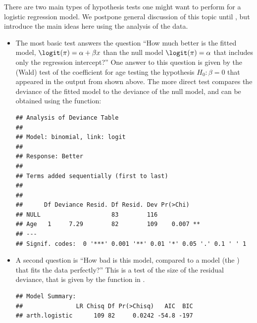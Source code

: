 \documentclass[11pt]{book}
\renewenvironment{knitrout}{\small\renewcommand{\baselinestretch}{.85}}{} %
\begin{document}
There are two main types of hypothesis tests one might want to perform for a
logistic regression model. We postpone general discussion of this
topic until , but introduce the main ideas here
using the analysis of the  data.
\begin{itemize}
  \item The most basic test answers the
question ``How much better is the fitted model, $\logit(\pi) = \alpha + \beta x$
than the null model $\logit(\pi) = \alpha$ that includes only the
regression intercept?'' One answer to this question is given by the
(Wald) test of the coefficient for age testing the hypothesis $H_0: \beta = 0$
that appeared in the output from
 shown above. 
The more direct test compares the deviance of the fitted model to the deviance
of the null model, and can be obtained using the  function:


\begin{knitrout}
\color{fgcolor}\begin{kframe}
\begin{alltt}
 \hlstd{=}\hlstd{)}
\end{alltt}
\begin{verbatim}
## Analysis of Deviance Table
## 
## Model: binomial, link: logit
## 
## Response: Better
## 
## Terms added sequentially (first to last)
## 
## 
##      Df Deviance Resid. Df Resid. Dev Pr(>Chi)   
## NULL                    83        116            
## Age   1     7.29        82        109    0.007 **
## ---
## Signif. codes:  0 '***' 0.001 '**' 0.01 '*' 0.05 '.' 0.1 ' ' 1
\end{verbatim}
\end{kframe}
\end{knitrout}

  \item A second question is ``How bad is this model, compared to a model
  (the ) that fits the data perfectly?''  This is a test
  of the size of the residual deviance, that is given by the function
   in .
\begin{knitrout}
\color{fgcolor}\begin{kframe}
\begin{alltt}
\end{alltt}
\begin{verbatim}
## Model Summary:
##               LR Chisq Df Pr(>Chisq)   AIC  BIC
## arth.logistic      109 82     0.0242 -54.8 -197
\end{verbatim}
\end{kframe}
\end{knitrout}


\end{itemize}
\end{document}
